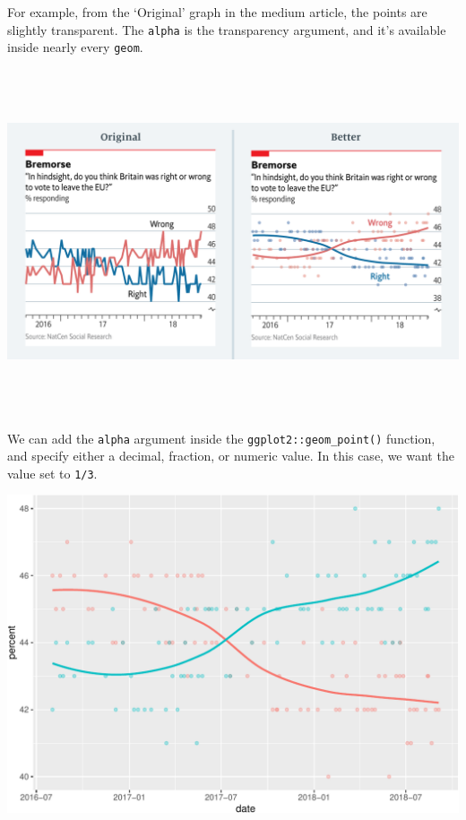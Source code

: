 \documentclass[letterpaper,12pt,twoside,]{pinp}
\begin{document}
For example, from the `Original' graph in the medium article, the points
are slightly transparent. The \texttt{alpha} is the transparency
argument, and it's available inside nearly every \texttt{geom}.

\begin{center}\includegraphics[width=7in,height=4in]{../img/original-brexit} \end{center}

We can add the \texttt{alpha} argument inside the
\texttt{ggplot2::geom\_point()} function, and specify either a decimal,
fraction, or numeric value. In this case, we want the value set to
\texttt{1/3}.

\begin{Shaded}
\begin{Highlighting}[]
\SpecialCharTok{+} 
  \NormalTok{(}\NormalTok{(} \NormalTok{, } \SpecialCharTok{/}\NormalTok{)}
\end{Highlighting}
\end{Shaded}

\begin{center}\includegraphics{03-intro-to-ggplot2_files/figure-latex/geom_point-alpha-1} \end{center}
\end{document}
